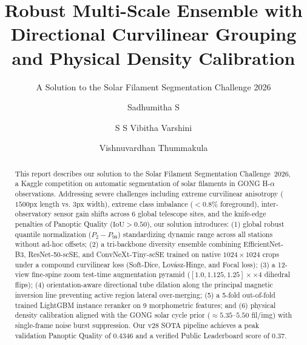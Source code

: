 \documentclass[sigconf]{acmart}
\begin{document}
\title{Robust Multi-Scale Ensemble with Directional Curvilinear Grouping and Physical Density Calibration}
\subtitle{A Solution to the Solar Filament Segmentation Challenge 2026}

\author{Sadhumitha S}

\author{S S Vibitha Varshini}

\author{Vishnuvardhan Thummakula}

\renewcommand{\shortauthors}{Sadhumitha S, Vibitha Varshini S S, and Thummakula V}

\begin{abstract}
    This report describes our solution to the Solar Filament Segmentation Challenge~2026, a Kaggle competition on automatic segmentation of solar filaments in GONG H-$\alpha$ observations. Addressing severe challenges including extreme curvilinear anisotropy ($1500\text{px}$ length vs. $3\text{px}$ width), extreme class imbalance ($< 0.8\%$ foreground), inter-observatory sensor gain shifts across 6 global telescope sites, and the knife-edge penalties of Panoptic Quality ($\text{IoU} > 0.50$), our solution introduces: (1) global robust quantile normalization ($P_2-P_{98}$) standardizing dynamic range across all stations without ad-hoc offsets; (2) a tri-backbone diversity ensemble combining EfficientNet-B3, ResNet-50-scSE, and ConvNeXt-Tiny-scSE trained on native $1024 \times 1024$ crops under a compound curvilinear loss (Soft-Dice, Lov\'asz-Hinge, and Focal loss); (3) a 12-view fine-spine zoom test-time augmentation pyramid ($[1.0, 1.125, 1.25]\times \times 4$ dihedral flips); (4) orientation-aware directional tube dilation along the principal magnetic inversion line preventing active region lateral over-merging; (5) a 5-fold out-of-fold trained LightGBM instance reranker on 9 morphometric features; and (6) physical density calibration aligned with the GONG solar cycle prior ($\approx 5.35\text{--}5.50$ fil/img) with single-frame noise burst suppression. Our v28 SOTA pipeline achieves a peak validation Panoptic Quality of $0.4346$ and a verified Public Leaderboard score of $0.37$.
\end{abstract}
\end{document}
